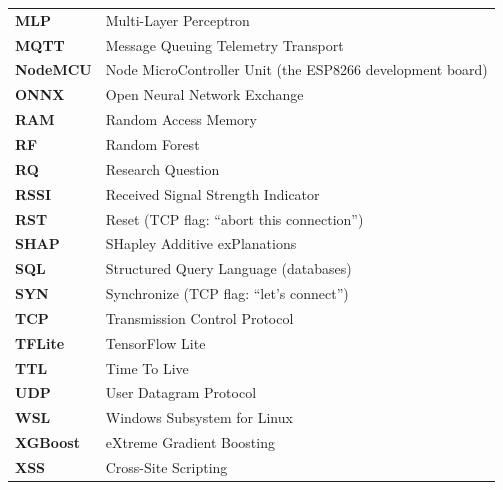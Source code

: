 \documentclass[11pt]{article}
\begin{document}
\begin{longtable}{@{}>{\bfseries}l >{\raggedright\arraybackslash}p{12.5cm}@{}}
MLP & Multi-Layer Perceptron \\
MQTT & Message Queuing Telemetry Transport \\
NodeMCU & Node MicroController Unit (the ESP8266 development board) \\
ONNX & Open Neural Network Exchange \\
RAM & Random Access Memory \\
RF & Random Forest \\
RQ & Research Question \\
RSSI & Received Signal Strength Indicator \\
RST & Reset (TCP flag: ``abort this connection'') \\
SHAP & SHapley Additive exPlanations \\
SQL & Structured Query Language (databases) \\
SYN & Synchronize (TCP flag: ``let's connect'') \\
TCP & Transmission Control Protocol \\
TFLite & TensorFlow Lite \\
TTL & Time To Live \\
UDP & User Datagram Protocol \\
WSL & Windows Subsystem for Linux \\
XGBoost & eXtreme Gradient Boosting \\
XSS & Cross-Site Scripting \\
\bottomrule
\end{longtable}
\end{document}
